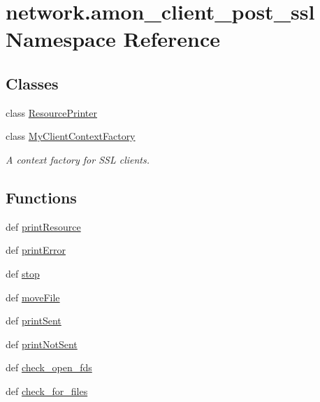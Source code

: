 \hypertarget{namespacenetwork_1_1amon__client__post__ssl}{\section{network.\-amon\-\_\-client\-\_\-post\-\_\-ssl Namespace Reference}
\label{namespacenetwork_1_1amon__client__post__ssl}
}
\subsection*{Classes}
\begin{DoxyCompactItemize}
\item 
class \hyperlink{classnetwork_1_1amon__client__post__ssl_1_1_resource_printer}{Resource\-Printer}
\item 
class \hyperlink{classnetwork_1_1amon__client__post__ssl_1_1_my_client_context_factory}{My\-Client\-Context\-Factory}
\begin{DoxyCompactList}\small\item\em A context factory for S\-S\-L clients. \end{DoxyCompactList}\end{DoxyCompactItemize}
\subsection*{Functions}
\begin{DoxyCompactItemize}
\item 
def \hyperlink{namespacenetwork_1_1amon__client__post__ssl_ad44cfb043a0685fccba5827546a5027a}{print\-Resource}
\item 
def \hyperlink{namespacenetwork_1_1amon__client__post__ssl_ab82180c2df65839107c0d678b332670f}{print\-Error}
\item 
def \hyperlink{namespacenetwork_1_1amon__client__post__ssl_a1fb958592185e2935f4a26ba89f43be3}{stop}
\item 
def \hyperlink{namespacenetwork_1_1amon__client__post__ssl_a5d834c8b20a853e4a09a94f97bd398b8}{move\-File}
\item 
def \hyperlink{namespacenetwork_1_1amon__client__post__ssl_a6bfd6a2a6fe8cc6c8023a61b1d51662d}{print\-Sent}
\item 
def \hyperlink{namespacenetwork_1_1amon__client__post__ssl_a450eec998b6e3c16ec492aa875e8b724}{print\-Not\-Sent}
\item 
def \hyperlink{namespacenetwork_1_1amon__client__post__ssl_a025a2ab8d0ffbba4b8670373207e7f73}{check\-\_\-open\-\_\-fds}
\item 
def \hyperlink{namespacenetwork_1_1amon__client__post__ssl_acf71174ac3eb3231586c0f30bc52fdae}{check\-\_\-for\-\_\-files}
\end{DoxyCompactItemize}
